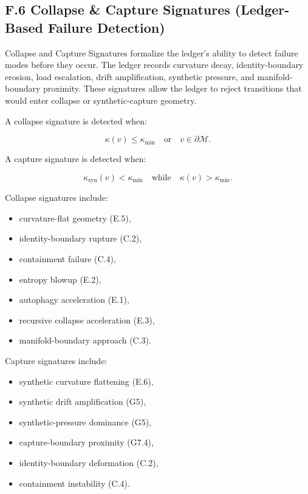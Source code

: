 

\subsection*{F.6 Collapse & Capture Signatures (Ledger-Based Failure Detection)}

\noindent Collapse and Capture Signatures formalize the ledger’s ability to
detect failure modes before they occur. The ledger records curvature decay,
identity-boundary erosion, load escalation, drift amplification, synthetic
pressure, and manifold-boundary proximity. These signatures allow the ledger to
reject transitions that would enter collapse or synthetic-capture geometry.

\medskip

\noindent A collapse signature is detected when:


\[
\kappa(v) \le \kappa_{\min}
\quad \text{or} \quad
v \in \partial\mathcal{M}.
\]



\noindent A capture signature is detected when:


\[
\kappa_{\mathrm{syn}}(v) < \kappa_{\min}
\quad \text{while} \quad
\kappa(v) > \kappa_{\min}.
\]



\medskip

\noindent Collapse signatures include:

\begin{itemize}
    \item curvature-flat geometry (E.5),
    \item identity-boundary rupture (C.2),
    \item containment failure (C.4),
    \item entropy blowup (E.2),
    \item autophagy acceleration (E.1),
    \item recursive collapse acceleration (E.3),
    \item manifold-boundary approach (C.3).
\end{itemize}

\medskip

\noindent Capture signatures include:

\begin{itemize}
    \item synthetic curvature flattening (E.6),
    \item synthetic drift amplification (G5),
    \item synthetic-pressure dominance (G5),
    \item capture-boundary proximity (G7.4),
    \item identity-boundary deformation (C.2),
    \item containment instability (C.4).
\end{itemize}

